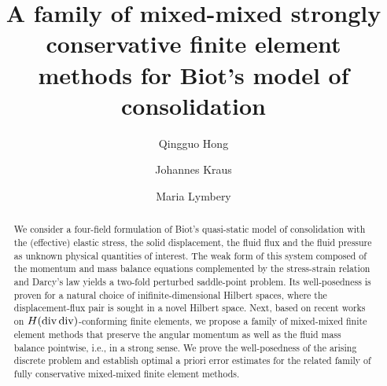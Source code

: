 \documentclass[11pt]{amsart}
\theoremstyle{remark}
\theoremstyle{definition}
\begin{document}
\title[Mixed-mixed conservative finite element methods for Biot's model]
{A family of mixed-mixed strongly conservative finite element methods for Biot's model of consolidation}

\author{Qingguo Hong}
\address{Email*: qingguohong@mst.edu\\
Department of Mathematics and Statistics, Missouri University of Science and Technology, Rolla, MO 65409, USA
}
\author{Johannes Kraus}
\address{Email: johannes.kraus@uni-due.de\\
Faculty of Mathematics, University of Duisburg-Essen, Thea-Leymann-Straße 9, Essen 45127, Germany
}
\author{Maria Lymbery}
\address{Email: maria.lymbery@uni-due.de\\
Faculty of Mathematics, University of Duisburg-Essen, Thea-Leymann-Straße 9, Essen 45127, Germany
}


\maketitle


\begin{abstract}
We consider a four-field formulation of Biot's quasi-static model of consolidation with the (effective) elastic stress, the solid displacement,
the fluid flux and the fluid pressure as unknown physical quantities of interest. The weak form of this system composed of
the momentum and mass balance equations complemented by the stress-strain relation and Darcy's law yields a two-fold perturbed saddle-point problem. 
Its well-posedness is proven for a natural choice of inifinite-dimensional Hilbert spaces, where the displacement-flux pair is sought in a novel Hilbert space.
Next, based on recent works on $H(\rm div \, \rm div)$-conforming finite elements, we propose a family of
mixed-mixed finite element methods that preserve the angular momentum as well as the fluid mass balance pointwise, i.e., in a strong sense.
We prove the well-posedness of the arising discrete problem and establish optimal a priori error estimates for the related family of fully conservative mixed-mixed finite element methods.

\end{abstract}
\end{document}
